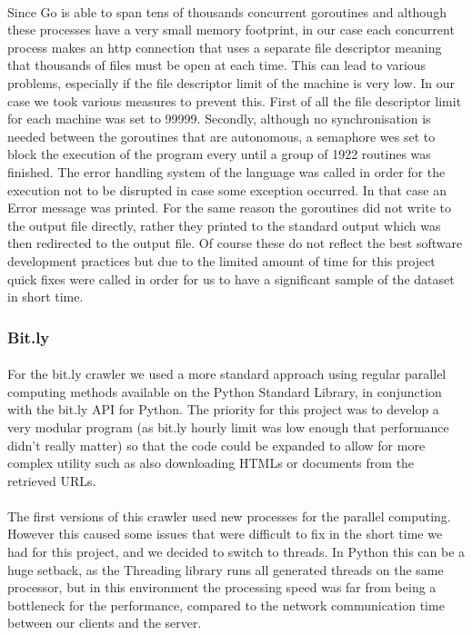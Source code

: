 \documentclass[12pt]{article}
\begin{document}
\paragraph{}
Since Go is able to span tens of thousands concurrent goroutines and although these processes have a very small memory footprint, in our case each concurrent process makes an http connection that uses a separate file descriptor meaning that thousands of files must be open at each time. This can lead to various problems, especially if the file descriptor limit of the machine is very low. In our case we took various measures to prevent this. First of all the file descriptor limit for each machine was set to 99999. Secondly, although no synchronisation is needed between the goroutines that are autonomous, a semaphore wes set to block the execution of the program every until a group of 1922 routines was finished. The error handling system of the language was called in order for the execution not to be disrupted in case some exception occurred. In that case an Error message was printed. For the same reason the goroutines did not write to the output file directly, rather they printed to the standard output which was then redirected to the output file. Of course these do not reflect the best software development practices but due to the limited amount of time for this project quick fixes were called in order for us to have a significant sample of the dataset in short time.  


\subsubsection{Bit.ly}

\paragraph{}
For the bit.ly crawler we used a more standard approach using regular parallel computing methods available on the Python Standard Library, in conjunction with the bit.ly API for Python. The priority for this project was to develop a very modular program (as bit.ly hourly limit was low enough that performance didn't really matter) so that the code could be expanded to allow for more complex utility such as also downloading HTMLs or documents from the retrieved URLs.

\paragraph{}
The first versions of this crawler used new processes for the parallel computing. However this caused some issues that were difficult to fix in the short time we had for this project, and we decided to switch to threads. In Python this can be a huge setback, as the Threading library runs all generated threads on the same processor, but in this environment the processing speed was far from being a bottleneck for the performance, compared to the network communication time between our clients and the server.
\end{document}
